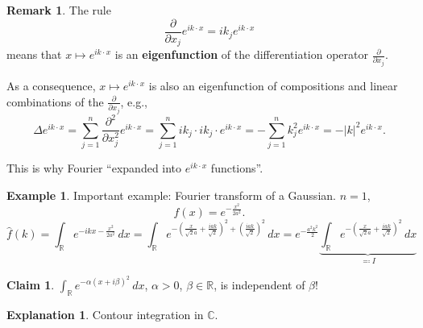 \documentclass[12pt]{article}
\theoremstyle{definition}
\newtheorem*{claim*}{Claim}
\newtheorem*{remark}{Remark}
\newtheorem{explanation}{Explanation}
\newtheorem*{example*}{Example}
\begin{document}
\begin{remark}
The rule
\[\frac{\partial}{\partial x_j}e^{ik\cdot x}=ik_je^{ik\cdot x}\]
means that $x\mapsto e^{ik\cdot x}$ is an \textbf{eigenfunction} of the differentiation operator $\frac{\partial}{\partial x_j}$.

As a consequence, $x\mapsto e^{ik\cdot x}$ is also an eigenfunction of compositions and linear combinations of the $\frac{\partial}{\partial x_j}$, e.g.,
\[\Delta e^{ik\cdot x}=\sum_{j=1}^n\frac{\partial^2}{\partial x_j^2}e^{ik\cdot x}=\sum_{j=1}^nik_j\cdot ik_j\cdot e^{ik\cdot x}=-\sum_{j=1}^nk_j^2e^{ik\cdot x}=-|k|^2e^{ik\cdot x}.\]

This is why Fourier ``expanded into $e^{ik\cdot x}$ functions''.
\end{remark}

\begin{example*}
Important example: Fourier transform of a Gaussian. $n=1$,
\[f(x)=e^{-\frac{x^2}{2a^2}}.\]
\[\hat{f}(k)=\int_{\mathbb{R}}e^{-ikx-\frac{x^2}{2a^2}}\,dx=\int_{\mathbb{R}}e^{-\left(\frac{x}{\sqrt{2}a}+\frac{iak}{\sqrt{2}}\right)^2+\left(\frac{iak}{\sqrt{2}}\right)^2}\,dx=e^{-\frac{a^2k^2}{2}}\underbrace{\int_{\mathbb{R}}e^{-\left(\frac{x}{\sqrt{2}a}+\frac{iak}{\sqrt{2}}\right)^2}\,dx}_{\eqqcolon I}\]

\begin{claim*}
$\int_{\mathbb{R}}e^{-\alpha(x+i\beta)^2}\,dx$, $\alpha>0$, $\beta\in\mathbb{R}$, is independent of $\beta$!
\end{claim*}

\begin{explanation}
Contour integration in $\mathbb{C}$.

\begin{center}
\end{center}


\end{explanation}
\end{example*}
\end{document}
